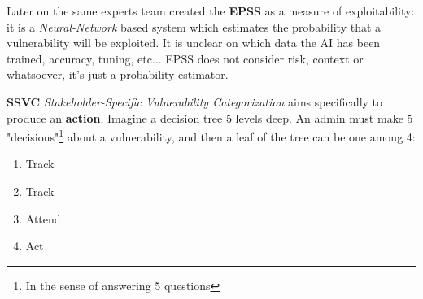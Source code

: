 Later on the same experts team created the \textbf{EPSS} as a measure of exploitability:
it is a \textit{Neural-Network} based system which estimates the probability that a vulnerability will be exploited.
It is unclear on which data the AI has been trained, accuracy, tuning, etc...
EPSS does not consider risk, context or whatsoever, it's just a probability estimator.

\textbf{SSVC} \textit{Stakeholder-Specific Vulnerability Categorization} aims specifically to produce an \textbf{action}. 
Imagine a decision tree 5 levels deep. An admin must make 5 "decisions"\footnote{In the sense of answering 5 questions} about a vulnerability, and then a leaf of the tree can be one among 4:
\begin{enumerate}
    \item {\color{green}Track}
    \item {\color{yellow}Track}
    \item {\color{orange}Attend}
    \item {\color{red}Act}
\end{enumerate}


